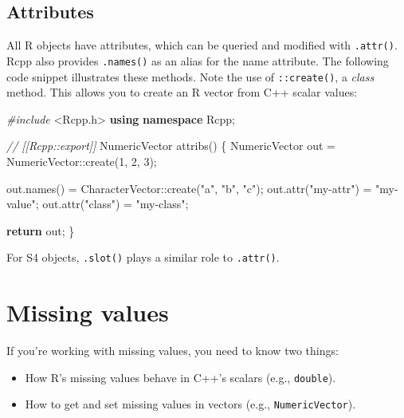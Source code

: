 \documentclass[]{book}
\makeatletter
\newenvironment{Shaded}{\begin{snugshade}}{\end{snugshade}}
\newcommand{\CommentTok}[1]{\textcolor[rgb]{0.37,0.37,0.37}{\textit{#1}}}
\newcommand{\ControlFlowTok}[1]{\textcolor[rgb]{0.27,0.27,0.27}{\textbf{#1}}}
\newcommand{\DecValTok}[1]{\textcolor[rgb]{0.06,0.06,0.06}{#1}}
\newcommand{\ImportTok}[1]{#1}
\newcommand{\KeywordTok}[1]{\textcolor[rgb]{0.27,0.27,0.27}{\textbf{#1}}}
\newcommand{\NormalTok}[1]{#1}
\newcommand{\PreprocessorTok}[1]{\textcolor[rgb]{0.37,0.37,0.37}{\textit{#1}}}
\newcommand{\StringTok}[1]{\textcolor[rgb]{0.5,0.5,0.5}{#1}}
\providecommand{\tightlist}{%
  \setlength{\itemsep}{0pt}\setlength{\parskip}{0pt}}
\newcommand{\indexc}[1]{\index{#1@\texttt{#1}}}
\makeatother
\begin{document}
\hypertarget{attributes}{%
\subsection{Attributes}\label{attributes}}


All R objects have attributes, which can be queried and modified with \texttt{.attr()}. Rcpp also provides \texttt{.names()} as an alias for the name attribute. The following code snippet illustrates these methods. Note the use of \texttt{::create()}, a \emph{class} method. This allows you to create an R vector from C++ scalar values:

\begin{Shaded}
\begin{Highlighting}[]
\PreprocessorTok{#include }\ImportTok{<Rcpp.h>}
\KeywordTok{using} \KeywordTok{namespace}\NormalTok{ Rcpp;}

\CommentTok{// [[Rcpp::export]]}
\NormalTok{NumericVector attribs() \{}
\NormalTok{  NumericVector out = NumericVector::create(}\DecValTok{1}\NormalTok{, }\DecValTok{2}\NormalTok{, }\DecValTok{3}\NormalTok{);}

\NormalTok{  out.names() = CharacterVector::create(}\StringTok{"a"}\NormalTok{, }\StringTok{"b"}\NormalTok{, }\StringTok{"c"}\NormalTok{);}
\NormalTok{  out.attr(}\StringTok{"my-attr"}\NormalTok{) = }\StringTok{"my-value"}\NormalTok{;}
\NormalTok{  out.attr(}\StringTok{"class"}\NormalTok{) = }\StringTok{"my-class"}\NormalTok{;}

  \ControlFlowTok{return}\NormalTok{ out;}
\NormalTok{\}}
\end{Highlighting}
\end{Shaded}

For S4 objects, \texttt{.slot()} plays a similar role to \texttt{.attr()}.

\hypertarget{rcpp-na}{%
\section{Missing values}\label{rcpp-na}}

\indexc{NA}

If you're working with missing values, you need to know two things:

\begin{itemize}
\tightlist
\item
  How R's missing values behave in C++'s scalars (e.g., \texttt{double}).
\item
  How to get and set missing values in vectors (e.g., \texttt{NumericVector}).
\end{itemize}
\end{document}
